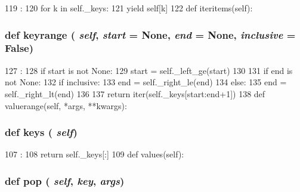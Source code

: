 \begin{DoxyCode}
119                         :
120         for k in self._keys:
121             yield self[k]
122 
    def iteritems(self):
\end{DoxyCode}
\hypertarget{classm5_1_1util_1_1sorteddict_1_1SortedDict_a6a19cd13e968887bb9941ec83b4430f3}{
\subsubsection[{keyrange}]{\setlength{\rightskip}{0pt plus 5cm}def keyrange ( {\em self}, \/   {\em start} = {\ttfamily None}, \/   {\em end} = {\ttfamily None}, \/   {\em inclusive} = {\ttfamily False})}}
\label{classm5_1_1util_1_1sorteddict_1_1SortedDict_a6a19cd13e968887bb9941ec83b4430f3}



\begin{DoxyCode}
127                                                              :
128         if start is not None:
129             start = self._left_ge(start)
130 
131         if end is not None:
132             if inclusive:
133                 end = self._right_le(end)
134             else:
135                 end = self._right_lt(end)
136 
137         return iter(self._keys[start:end+1])
138 
    def valuerange(self, *args, **kwargs):
\end{DoxyCode}
\hypertarget{classm5_1_1util_1_1sorteddict_1_1SortedDict_aeb7ba70a3c91eced4f8d49ac5dc0c398}{
\subsubsection[{keys}]{\setlength{\rightskip}{0pt plus 5cm}def keys ( {\em self})}}
\label{classm5_1_1util_1_1sorteddict_1_1SortedDict_aeb7ba70a3c91eced4f8d49ac5dc0c398}



\begin{DoxyCode}
107                   :
108         return self._keys[:]
109 
    def values(self):
\end{DoxyCode}
\hypertarget{classm5_1_1util_1_1sorteddict_1_1SortedDict_a3752d00352e543cac49d837935da714b}{
\subsubsection[{pop}]{\setlength{\rightskip}{0pt plus 5cm}def pop ( {\em self}, \/   {\em key}, \/   {\em args})}}
\label{classm5_1_1util_1_1sorteddict_1_1SortedDict_a3752d00352e543cac49d837935da714b}




